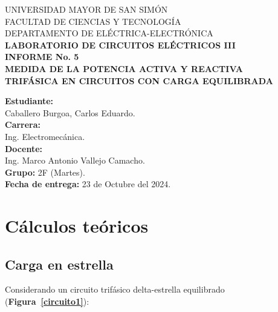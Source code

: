 \documentclass[letter,11pt]{article}
\begin{document}
\begin{titlepage}
    \begin{center}
        {\Large UNIVERSIDAD MAYOR DE SAN SIMÓN}\\
        \vspace*{0.15cm}
        {\large FACULTAD DE CIENCIAS Y TECNOLOGÍA}\\
        \vspace*{0.10cm}
        DEPARTAMENTO DE ELÉCTRICA-ELECTRÓNICA\\
        \vspace*{3.0cm}
        {\Large \textbf{LABORATORIO DE CIRCUITOS ELÉCTRICOS III}}\\
        \vspace*{0.3cm}
        {\Large \textbf{INFORME No. 5}}\\
        \vspace*{3.5cm}
        {\Large \textbf{MEDIDA DE LA POTENCIA ACTIVA Y REACTIVA\\
        TRIFÁSICA EN CIRCUITOS CON CARGA EQUILIBRADA}}\\
    \end{center}

    \vspace*{5.8cm}
    \leftskip=7.95cm
    \noindent
    \textbf{Estudiante:}\\
    Caballero Burgoa, Carlos Eduardo.\\
    \newline
    \textbf{Carrera:}\\
    Ing. Electromecánica.\\
    \newline
    \textbf{Docente:}\\
    Ing. Marco Antonio Vallejo Camacho.\\
    \newline
    \textbf{Grupo:} 2F (Martes).\\
\textbf{Fecha de entrega:} 23 de Octubre del 2024.\\
\end{titlepage}

\section{Cálculos teóricos}

\subsection{Carga en estrella}
Considerando un circuito trifásico delta-estrella equilibrado
(\textbf{Figura~\ref{circuito1}}):
\end{document}
